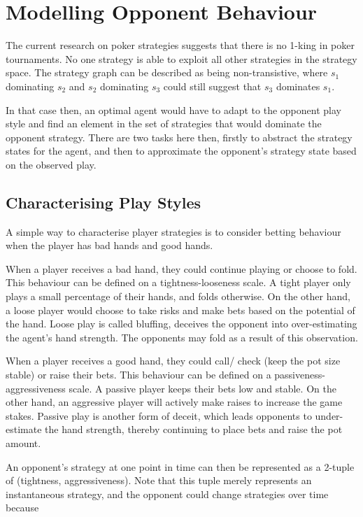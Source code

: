 \documentclass{article}
\begin{document}
\section{Modelling Opponent Behaviour}

The current research on poker strategies suggests that there is no 1-king in poker tournaments. No one strategy is able to exploit all other strategies in the strategy space. The strategy graph can be described as being non-transistive, where $s_1$ dominating $s_2$ and $s_2$ dominating $s_3$ could still suggest that $s_3$ dominates $s_1$.

In that case then, an optimal agent would have to adapt to the opponent play style and find an element in the set of strategies that would dominate the opponent strategy.  There are two tasks here then, firstly to abstract the strategy states for the agent, and then to approximate the opponent's strategy state based on the observed play.

\subsection{Characterising Play Styles}
A simple way to characterise player strategies is to consider betting behaviour when the player has bad hands and good hands. 

When a player receives a bad hand, they could continue playing or choose to fold. This behaviour can be defined on a tightness-looseness scale. A tight player only plays a small percentage of their hands, and folds otherwise. On the other hand, a loose player would choose to take risks and make bets based on the potential of the hand. Loose play is called bluffing, deceives the opponent into over-estimating the agent's hand strength. The opponents may fold as a result of this observation.

When a player receives a good hand, they could call/ check (keep the pot size stable) or raise their bets. This behaviour can be defined on a passiveness-aggressiveness scale. A passive player keeps their bets low and stable. On the other hand, an aggressive player will actively make raises to increase the game stakes. Passive play is another form of deceit, which leads opponents to under-estimate the hand strength, thereby continuing to place bets and raise the pot amount.

An opponent's strategy at one point in time can then be represented as a 2-tuple of (tightness, aggressiveness). Note that this tuple merely represents an instantaneous strategy, and the opponent could change strategies over time because
\end{document}
